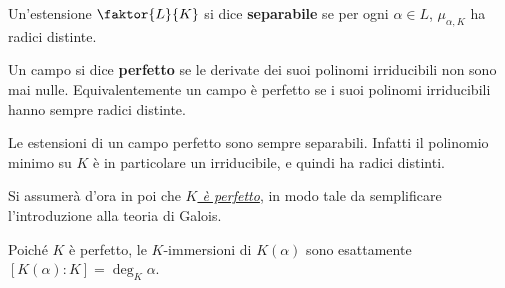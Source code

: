\documentclass[12pt]{scrartcl}
\begin{document}
	\hr
	
	\begin{definition}
		Un'estensione $\faktor{L}{K}$ si dice \textbf{separabile}
		se per ogni $\alpha \in L$, $\mu_{\alpha,K}$ ha radici
		distinte.
	\end{definition}
	
	\begin{definition}
		Un campo si dice \textbf{perfetto} se le derivate dei
		suoi polinomi irriducibili non sono mai nulle. 
		Equivalentemente un campo è perfetto se i suoi
		polinomi irriducibili hanno sempre radici distinte.
	\end{definition}
	
	\begin{remark}
		Le estensioni di un campo perfetto sono sempre separabili.
		Infatti il polinomio minimo su $K$ è in particolare
		un irriducibile, e quindi ha radici distinti.
	\end{remark}
	
	\begin{note}
		Si assumerà d'ora in poi che \underline{\textit{$K$
		è perfetto}}, in modo tale da semplificare l'introduzione
		alla teoria di Galois.
	\end{note}
	
	\begin{remark}
		Poiché $K$ è perfetto, le $K$-immersioni di $K(\alpha)$
		sono esattamente $[K(\alpha) : K] = \deg_K \alpha$.
	\end{remark}
\end{document}

